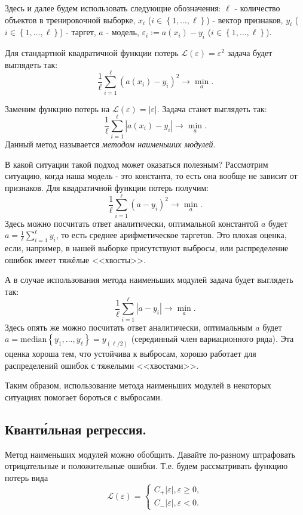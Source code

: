 Здесь и далее будем использовать следующие обозначения: $\ell$ - количество объектов в тренировочной выборке, $x_i$ ($i \in \left\{1, \dotsc, \ell \right\}$) - вектор признаков, $y_i$ ($i \in \left\{1, \dotsc, \ell \right\}$) - таргет, $a$ - модель, $\varepsilon_i := a(x_i) - y_i$ ($i \in \left\{1, \dotsc, \ell \right\}$).

Для стандартной квадратичной функции потерь $\mathscr{L}(\varepsilon) = \varepsilon^2$ задача будет выглядеть так:
$$\frac{1}{\ell}\sum\limits_{i=1}^\ell\left(a(x_i) - y_i\right)^2 \longrightarrow \min\limits_{a}.$$

Заменим функцию потерь на $\mathscr{L}(\varepsilon) = |\varepsilon|$.
Задача станет выглядеть так:
$$\frac{1}{\ell}\sum\limits_{i=1}^\ell\left|a(x_i) - y_i\right| \longrightarrow \min\limits_{a}.$$
Данный метод называется \textit{методом наименьших модулей}.

В какой ситуации такой подход может оказаться полезным? Рассмотрим ситуацию,  когда наша модель - это константа, то есть она вообще не зависит от признаков. Для квадратичной функции потерь получим:
$$\frac{1}{\ell}\sum\limits_{i=1}^\ell\left(a - y_i\right)^2 \longrightarrow \min\limits_{a}.$$
Здесь можно посчитать ответ аналитически, оптимальной константой $a$ будет $a = \frac{1}{\ell}\sum\limits_{i=1}^\ell y_i$, то есть среднее арифметическое таргетов. Это плохая оценка, если, например, в нашей выборке присутствуют выбросы, или распределение ошибок имеет тяжёлые <<хвосты>>.

А в случае использования метода наименьших модулей задача будет выглядеть так:
$$\frac{1}{\ell}\sum\limits_{i=1}^\ell\left|a - y_i\right| \longrightarrow \min\limits_{a}.$$
Здесь опять же можно посчитать ответ аналитически, оптимальным $a$ будет $a = \text{median}\left\{ y_1, \dotsc, y_\ell \right\} = y_{(\ell / 2)}$ (серединный член вариационного ряда). Эта оценка хороша тем, что устойчива к выбросам, хорошо работает для распределений ошибок с тяжелыми <<хвостами>>.

Таким образом, использование метода наименьших модулей в некоторых ситуациях помогает бороться с выбросами.

\subsection*{Квант\'{и}льная регрессия.}

Метод наименьших модулей можно обобщить. Давайте по-разному штрафовать отрицательные и положительные ошибки. Т.е. будем рассматривать функцию потерь вида
$$\mathscr{L}(\varepsilon) = \begin{cases}
        C_+|\varepsilon|, \varepsilon \geq 0, \\
        C_-|\varepsilon|, \varepsilon < 0.
    \end{cases}$$

